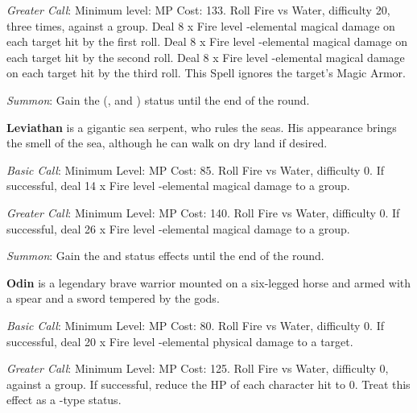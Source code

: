 \begin{multicols}{2}
    \textit{Greater Call}: Minimum level:  MP Cost: 133. Roll Fire vs Water, difficulty 20, three times, against a group. Deal 8 x Fire level -elemental magical damage on each target hit by the first roll. Deal 8 x Fire level -elemental magical damage on each target hit by the second roll. Deal 8 x Fire level -elemental magical damage on each target hit by the third roll. This Spell ignores the target’s Magic Armor.
    
    \textit{Summon}: Gain the  (,  and ) status until the end of the round.

    \ffcrystal[type=level,height=8pt]
    
    \textbf{Leviathan} is a gigantic sea serpent, who rules the seas. His appearance brings the smell of the sea, although he can walk on dry land if desired.
    
    \textit{Basic Call}: Minimum Level:  MP Cost: 85. Roll Fire vs Water, difficulty 0. If successful, deal 14 x Fire level -elemental magical damage to a group.
    
    \textit{Greater Call}: Minimum Level:  MP Cost: 140. Roll Fire vs Water, difficulty 0. If successful, deal 26 x Fire level -elemental magical damage to a group.
    
    \textit{Summon}: Gain the   and   status effects until the end of the round.

    \ffcrystal[type=level,height=8pt]
    
    \textbf{Odin} is a legendary brave warrior mounted on a six-legged horse and armed with a spear and a sword tempered by the gods.
    
    \textit{Basic Call}: Minimum Level:  MP Cost: 80. Roll Fire vs Water, difficulty 0. If successful, deal 20 x Fire level -elemental physical damage to a target.
    
    \textit{Greater Call}: Minimum Level:  MP Cost: 125. Roll Fire vs Water, difficulty 0, against a group. If successful, reduce the HP of each character hit to 0. Treat this effect as a -type status.
    

\end{multicols}
